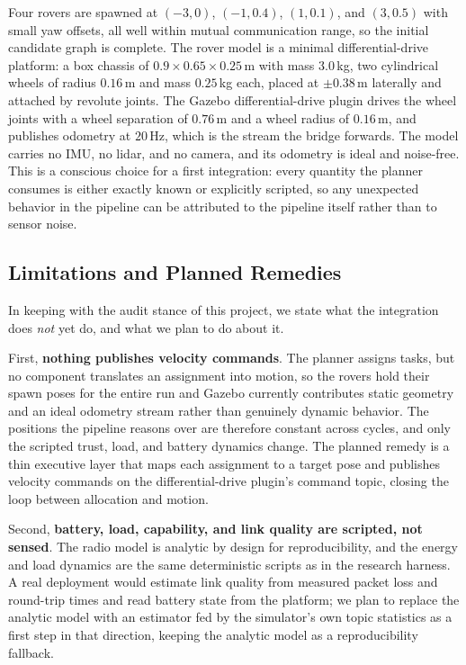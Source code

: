 Four rovers are spawned at $(-3, 0)$, $(-1, 0.4)$, $(1, 0.1)$, and
$(3, 0.5)$ with small yaw offsets, all well within mutual communication
range, so the initial candidate graph is complete. The rover model is a
minimal differential-drive platform: a box chassis of $0.9 \times 0.65
\times 0.25$\,m with mass $3.0$\,kg, two cylindrical wheels of radius
$0.16$\,m and mass $0.25$\,kg each, placed at $\pm 0.38$\,m laterally
and attached by revolute joints. The Gazebo differential-drive plugin
drives the wheel joints with a wheel separation of $0.76$\,m and a wheel
radius of $0.16$\,m, and publishes odometry at $20$\,Hz, which is the
stream the bridge forwards. The model carries no IMU, no lidar, and no
camera, and its odometry is ideal and noise-free. This is a conscious
choice for a first integration: every quantity the planner consumes is
either exactly known or explicitly scripted, so any unexpected behavior
in the pipeline can be attributed to the pipeline itself rather than to
sensor noise.

\subsection{Limitations and Planned Remedies}
\label{sec:gazebo:limitations}

In keeping with the audit stance of this project, we state what the
integration does \emph{not} yet do, and what we plan to do about it.

First, \textbf{nothing publishes velocity commands}. The planner assigns
tasks, but no component translates an assignment into motion, so the
rovers hold their spawn poses for the entire run and Gazebo currently
contributes static geometry and an ideal odometry stream rather than
genuinely dynamic behavior. The positions the pipeline reasons over are
therefore constant across cycles, and only the scripted trust, load, and
battery dynamics change. The planned remedy is a thin executive layer
that maps each assignment to a target pose and publishes velocity
commands on the differential-drive plugin's command topic, closing the
loop between allocation and motion.

Second, \textbf{battery, load, capability, and link quality are
scripted, not sensed}. The radio model is analytic by design for
reproducibility, and the energy and load dynamics are the same
deterministic scripts as in the research harness. A real deployment
would estimate link quality from measured packet loss and round-trip
times and read battery state from the platform; we plan to replace the
analytic model with an estimator fed by the simulator's own topic
statistics as a first step in that direction, keeping the analytic model
as a reproducibility fallback.


